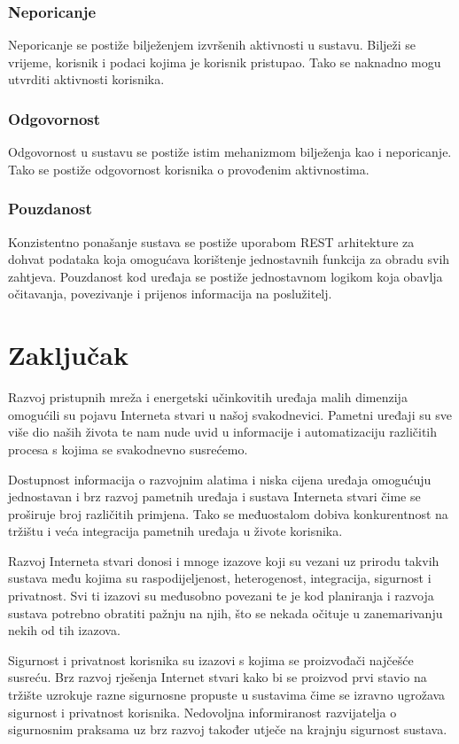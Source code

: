 \documentclass[times, utf8, diplomski]{fer}
\begin{document}
\subsection{Neporicanje}
Neporicanje se postiže bilježenjem izvršenih aktivnosti u sustavu. Bilježi se vrijeme, korisnik i podaci kojima je korisnik pristupao. Tako se naknadno mogu utvrditi aktivnosti korisnika.

\subsection{Odgovornost}
Odgovornost u sustavu se postiže istim mehanizmom bilježenja kao i neporicanje. Tako se postiže odgovornost korisnika o provođenim aktivnostima.

\subsection{Pouzdanost}
Konzistentno ponašanje sustava se postiže uporabom REST arhitekture za dohvat podataka koja omogućava korištenje jednostavnih funkcija za obradu svih zahtjeva. Pouzdanost kod uređaja se postiže jednostavnom logikom koja obavlja očitavanja, povezivanje i prijenos informacija na poslužitelj.

\chapter{Zaključak}
Razvoj pristupnih mreža i energetski učinkovitih uređaja malih dimenzija omogućili su pojavu Interneta stvari u našoj svakodnevici. Pametni uređaji su sve više dio naših života te nam nude uvid u informacije i automatizaciju različitih procesa s kojima se svakodnevno susrećemo. 

Dostupnost informacija o razvojnim alatima i niska cijena uređaja omogućuju jednostavan i brz razvoj pametnih uređaja i sustava Interneta stvari čime se proširuje broj različitih primjena. Tako se međuostalom dobiva konkurentnost na tržištu i veća integracija pametnih uređaja u živote korisnika.

Razvoj Interneta stvari donosi i mnoge izazove koji su vezani uz prirodu takvih sustava među kojima su raspodijeljenost, heterogenost, integracija, sigurnost i privatnost. Svi ti izazovi su međusobno povezani te je kod planiranja i razvoja sustava potrebno obratiti pažnju na njih, što se nekada očituje u zanemarivanju nekih od tih izazova.

Sigurnost i privatnost korisnika su izazovi s kojima se proizvođači najčešće susreću. Brz razvoj rješenja Internet stvari kako bi se proizvod prvi stavio na tržište uzrokuje razne sigurnosne propuste u sustavima čime se izravno ugrožava sigurnost i privatnost korisnika. Nedovoljna informiranost razvijatelja o sigurnosnim praksama uz brz razvoj također utječe na krajnju sigurnost sustava.
\end{document}
